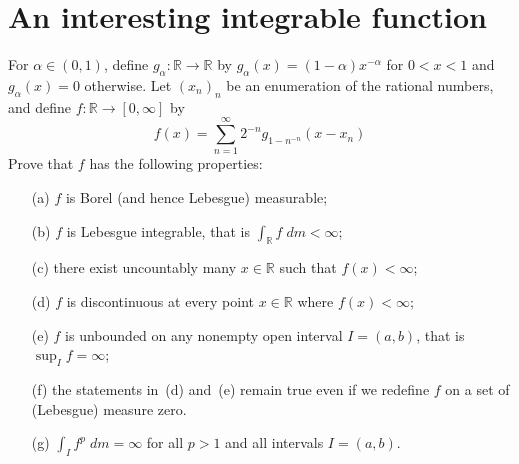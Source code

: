 \documentclass[lang=cn,11pt]{elegantbook}
\begin{document}
\section{An interesting integrable function}
  For $\alpha\in(0,1)$, define $g_\alpha\colon \mathbb{R}\to \mathbb{R}$ by $g_\alpha(x)=(1-\alpha)x^{-\alpha}$ for $0<x<1$ and $g_\alpha(x)=0$ otherwise. Let $(x_n)_n$ be an enumeration of the rational numbers, and define $f\colon \mathbb{R}\to[0,\infty]$ by
  \[
    f(x)=\sum_{n=1}^\infty2^{-n}g_{1-n^{-n}}(x-x_n)
  \]
  Prove that $f$ has the following properties:
  \begin{itemize}
  \item[(a)]$f$ is Borel (and hence Lebesgue) measurable;
  \item[(b)] $f$ is Lebesgue integrable, that is $\int_\mathbb{R} f\; d m<\infty$;
  \item[(c)]  there exist uncountably many $x\in\mathbb{R}$ such that $f(x)<\infty$;
  \item[(d)]  $f$ is discontinuous at every point $x\in\mathbb{R}$ where $f(x)<\infty$;
  \item[(e)]  $f$ is unbounded on any nonempty open interval $I=(a,b)$, that is $\sup_If=\infty$;
  \item[(f)]   the statements in~(d) and~(e) remain true even if we redefine $f$ on a set of (Lebesgue) measure zero.
  \item[(g)]$\int_I f^p\; d m=\infty$ for all $p>1$ and all intervals $I=(a,b)$.
  \end{itemize}
\end{document}
